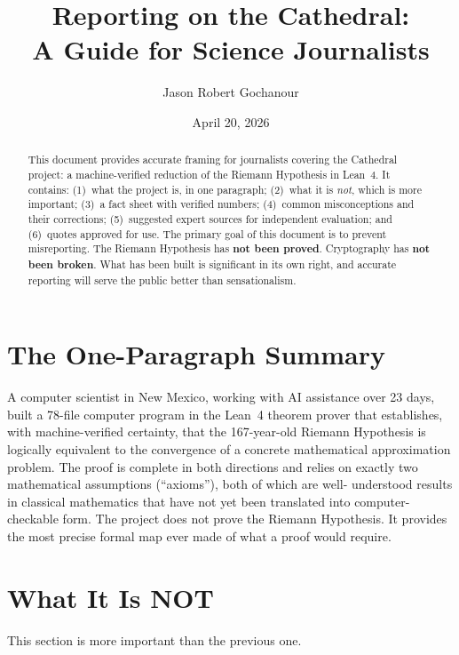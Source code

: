 \documentclass[11pt,a4paper]{article}
\title{%
  Reporting on the Cathedral:\\
  A Guide for Science Journalists%
}
\author{
  Jason Robert Gochanour
}
\date{April 20, 2026}
\begin{document}
\maketitle

\begin{abstract}
This document provides accurate framing for journalists covering
the Cathedral project: a machine-verified reduction of the
Riemann Hypothesis in Lean~4. It contains: (1)~what the project
is, in one paragraph; (2)~what it is \emph{not}, which is more
important; (3)~a fact sheet with verified numbers; (4)~common
misconceptions and their corrections; (5)~suggested expert sources
for independent evaluation; and (6)~quotes approved for use.
The primary goal of this document is to prevent misreporting.
The Riemann Hypothesis has \textbf{not been proved}. Cryptography
has \textbf{not been broken}. What has been built is significant
in its own right, and accurate reporting will serve the public
better than sensationalism.
\end{abstract}

\section{The One-Paragraph Summary}

A computer scientist in New Mexico, working with AI assistance over
23 days, built a 78-file computer program in the Lean~4 theorem
prover that establishes, with machine-verified certainty, that the
167-year-old Riemann Hypothesis is logically equivalent to the
convergence of a concrete mathematical approximation problem. The
proof is complete in both directions and relies on exactly two
mathematical assumptions (``axioms''), both of which are well-
understood results in classical mathematics that have not yet been
translated into computer-checkable form. The project does not prove
the Riemann Hypothesis. It provides the most precise formal map ever
made of what a proof would require.

\section{What It Is NOT}
\label{sec:not}

This section is more important than the previous one.
\end{document}
